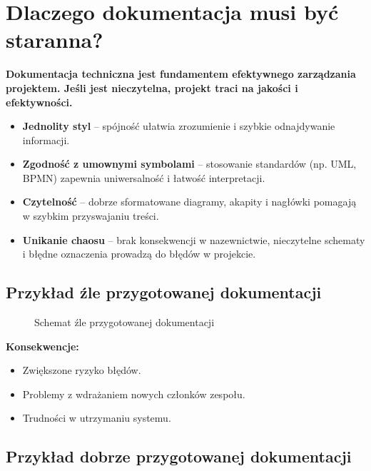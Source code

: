 \documentclass[a4paper,12pt]{article}
\begin{document}
\section{Dlaczego dokumentacja musi być staranna?}

\textbf{Dokumentacja techniczna jest fundamentem efektywnego zarządzania projektem. 
Jeśli jest nieczytelna, projekt traci na jakości i efektywności.}

\begin{itemize}
    \item \textbf{Jednolity styl} -- spójność ułatwia zrozumienie i szybkie odnajdywanie informacji.
    \item \textbf{Zgodność z umownymi symbolami} -- stosowanie standardów (np. UML, BPMN) zapewnia uniwersalność i łatwość interpretacji.
    \item \textbf{Czytelność} -- dobrze sformatowane diagramy, akapity i nagłówki pomagają w szybkim przyswajaniu treści.
    \item \textbf{Unikanie chaosu} -- brak konsekwencji w nazewnictwie, nieczytelne schematy i błędne oznaczenia prowadzą do błędów w projekcie.
\end{itemize}

\subsection{Przykład źle przygotowanej dokumentacji}

\begin{figure}[ht]
    \centering
    \caption{Schemat źle przygotowanej dokumentacji}
\end{figure}

\vspace{0.5cm}

\textbf{Konsekwencje:}
\begin{itemize}
    \item Zwiększone ryzyko błędów.
    \item Problemy z wdrażaniem nowych członków zespołu.
    \item Trudności w utrzymaniu systemu.
\end{itemize}

\subsection{Przykład dobrze przygotowanej dokumentacji}
\end{document}
